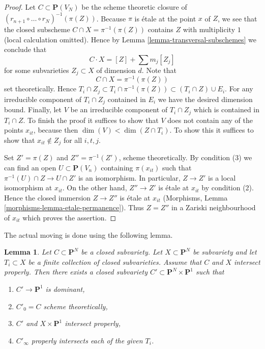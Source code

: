 \documentclass{stacks-project}
\theoremstyle{plain}
\newtheorem{lemma}[subsection]{Lemma}
\theoremstyle{definition}
\theoremstyle{remark}
\numberwithin{equation}{subsection}
\begin{document}
\begin{proof}
\medskip\noindent
Let $C \subset \mathbf{P}(V_N)$ be the scheme theoretic closure of
$(r_{n + 1} \circ \ldots \circ r_N)^{-1}(\pi(Z))$. Because $\pi$
is \'etale at the point $x$ of $Z$, we see that the closed subscheme
$C \cap X = \pi^{-1}(\pi(Z))$
contains $Z$ with multiplicity $1$ (local calculation omitted).
Hence by Lemma \ref{lemma-transversal-subschemes} we conclude that
$$
C \cdot X = [Z] + \sum m_j[Z_j]
$$
for some subvarieties $Z_j \subset X$ of dimension $d$. Note that
$$
C \cap X = \pi^{-1}(\pi(Z))
$$
set theoretically. Hence
$T_i \cap Z_j \subset T_i \cap \pi^{-1}(\pi(Z)) \subset (T_i \cap Z) \cup E_i$.
For any irreducible component of $T_i \cap Z_j$ contained in $E_i$ we
have the desired dimension bound. Finally, let $V$ be an irreducible
component of $T_i \cap Z_j$ which is contained in $T_i \cap Z$. To finish
the proof it suffices to show that $V$ does not contain any of the
points $x_{it}$, because then $\dim(V) < \dim(Z \cap T_i)$.
To show this it suffices to show that $x_{it} \not \in Z_j$
for all $i, t, j$.

\medskip\noindent
Set $Z' = \pi(Z)$ and $Z'' = \pi^{-1}(Z')$, scheme theoretically. By
condition (3) we can find an open $U \subset \mathbf{P}(V_n)$ containing
$\pi(x_{it})$ such that $\pi^{-1}(U) \cap Z \to U \cap Z'$ is an isomorphism.
In particular, $Z \to Z'$ is a local isomorphism at $x_{it}$.
On the other hand, $Z'' \to Z'$ is \'etale at $x_{it}$ by condition (2).
Hence the closed immersion $Z \to Z''$ is \'etale at $x_{it}$
(Morphisms, Lemma \ref{morphisms-lemma-etale-permanence}).
Thus $Z = Z''$ in a Zariski neighbourhood of $x_{it}$ which proves
the assertion.
\end{proof}

\noindent
The actual moving is done using the following lemma.

\begin{lemma}
\label{lemma-move}
Let $C \subset \mathbf{P}^N$ be a closed subvariety.
Let $X \subset \mathbf{P}^N$ be subvariety and let $T_i \subset X$
be a finite collection of closed subvarieties.
Assume that $C$ and $X$ intersect properly.
Then there exists a closed subvariety
$C' \subset \mathbf{P}^N \times \mathbf{P}^1$ such that
\begin{enumerate}
\item $C' \to \mathbf{P}^1$ is dominant,
\item $C'_0 = C$ scheme theoretically,
\item $C'$ and $X \times \mathbf{P}^1$ intersect properly,
\item $C'_\infty$ properly intersects each of the given $T_i$.
\end{enumerate}
\end{lemma}
\end{document}
